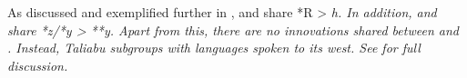 As discussed and exemplified further in ,
 and  share *R > \it{h}.
In addition, 
and  share *z/*y > **y.
Apart from this, there are no innovations
shared between  and .
Instead, Taliabu subgroups with  languages spoken to its west.
See  for full discussion.